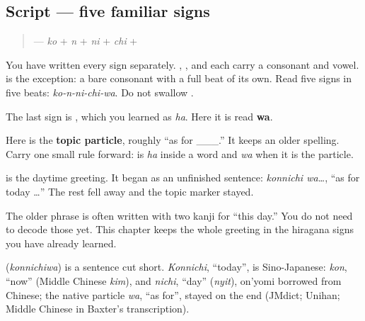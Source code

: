 \subsection*{Script — five familiar signs}
\begin{quote}
\textbf{} — \textbf{} \emph{ko} + \textbf{} \emph{n} + \textbf{} \emph{ni} + \textbf{} \emph{chi} + \textbf{}
\end{quote}

You have written every sign separately. \textbf{}, \textbf{}, and \textbf{} each carry a consonant and vowel. \textbf{} is the exception: a bare consonant with a full beat of its own. Read five signs in five beats: \emph{ko-n-ni-chi-wa}. Do not swallow \textbf{}.

\begin{grammarlens}[title={Grammar Lens — the sign \ja{は}, read \emph{wa}}]
The last sign is \textbf{}, which you learned as \emph{ha}. Here it is read \textbf{wa}.

Here \textbf{} is the \textbf{topic particle}, roughly \textquotedblleft{}as for \_\_\_.\textquotedblright{} It keeps an older spelling. Carry one small rule forward: \textbf{} is \emph{ha} inside a word and \emph{wa} when it is the particle.
\end{grammarlens}

\begin{culture}
\textbf{} is the daytime greeting. It began as an unfinished sentence: \emph{konnichi wa…}, \textquotedblleft{}as for today …\textquotedblright{} The rest fell away and the topic marker stayed.

The older phrase is often written with two kanji for \textquotedblleft{}this day.\textquotedblright{} You do not need to decode those yet. This chapter keeps the whole greeting in the hiragana signs you have already learned.
\end{culture}

\begin{cousinweb}
\textbf{} (\emph{konnichiwa}) is a sentence cut short. \emph{Konnichi}, \textquotedblleft{}today\textquotedblright{}, is Sino-Japanese: \emph{kon}, \textquotedblleft{}now\textquotedblright{} (Middle Chinese \emph{kim}), and \emph{nichi}, \textquotedblleft{}day\textquotedblright{} (\emph{nyit}), on'yomi borrowed from Chinese; the native particle \emph{wa}, \textquotedblleft{}as for\textquotedblright{}, stayed on the end (JMdict; Unihan; Middle Chinese in Baxter's transcription).
\end{cousinweb}

